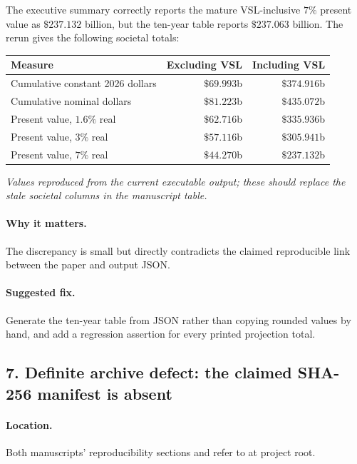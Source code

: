 \documentclass[11pt]{article}
\begin{document}
The executive summary correctly reports the mature VSL-inclusive \(7\%\)
present value as \(\$237.132\) billion, but the ten-year table reports
\(\$237.063\) billion.  The rerun gives the following societal totals:

\begin{center}
\centering
\small
\begin{tabular}{@{}lrr@{}}
\toprule
Measure & Excluding VSL & Including VSL\\
\midrule
Cumulative constant 2026 dollars & \(\$69.993\)b & \(\$374.916\)b\\
Cumulative nominal dollars & \(\$81.223\)b & \(\$435.072\)b\\
Present value, \(1.6\%\) real & \(\$62.716\)b & \(\$335.936\)b\\
Present value, \(3\%\) real & \(\$57.116\)b & \(\$305.941\)b\\
Present value, \(7\%\) real & \(\$44.270\)b & \(\$237.132\)b\\
\bottomrule
\end{tabular}

\emph{Values reproduced from the current executable output; these should
replace the stale societal columns in the manuscript table.}
\end{center}

\paragraph{Why it matters.}
The discrepancy is small but directly contradicts the claimed reproducible
link between the paper and output JSON.

\paragraph{Suggested fix.}
Generate the ten-year table from JSON rather than copying rounded values by
hand, and add a regression assertion for every printed projection total.

\subsection*{7. Definite archive defect: the claimed SHA-256 manifest is absent}

\paragraph{Location.}
Both manuscripts' reproducibility sections and
 refer to
 at project root.
\end{document}

